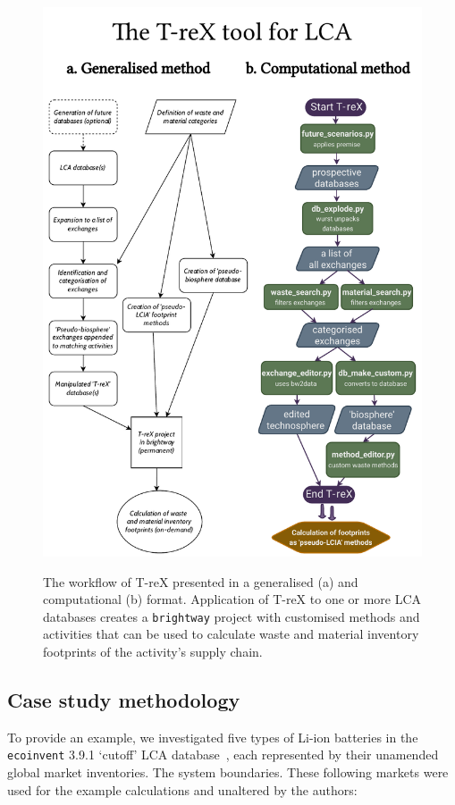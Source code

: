 \documentclass[a4paper,fleqn]{cas-dc}
\begin{document}
\begin{figure}
	\centering
	\caption{The workflow of T-reX presented in a generalised (a) and computational (b) format. Application of T-reX to one or more LCA databases creates a \texttt{brightway} project with customised methods and activities that can be used to calculate waste and material inventory footprints of the activity's supply chain.}
	\includegraphics[width=1.7\columnwidth]{figures/T-reX_method.pdf}\label{fig:methods-flowchart}
\end{figure}

\subsection{Case study methodology}\label{sec:method-casestudy}

To provide an example, we investigated five types of Li-ion batteries in the
\texttt{ecoinvent} 3.9.1 `cutoff' LCA database~\citep{ecoinvent2016version3},
each represented by their unamended global market inventories. The system
boundaries. These following markets were used for the example calculations and
unaltered by the authors:
\end{document}
